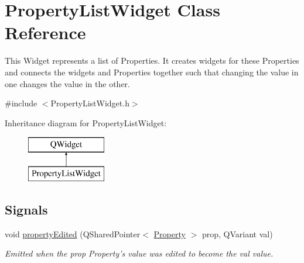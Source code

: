 \hypertarget{class_property_list_widget}{\section{Property\-List\-Widget Class Reference}
\label{class_property_list_widget}
}


This Widget represents a list of Properties. It creates widgets for these Properties and connects the widgets and Properties together such that changing the value in one changes the value in the other.  




{\ttfamily \#include $<$Property\-List\-Widget.\-h$>$}

Inheritance diagram for Property\-List\-Widget\-:\begin{figure}[H]
\begin{center}
\leavevmode
\includegraphics[height=2.000000cm]{class_property_list_widget}
\end{center}
\end{figure}
\subsection*{Signals}
\begin{DoxyCompactItemize}
\item 
\hypertarget{class_property_list_widget_a4cef6a2b7ac56007d324c7c7dd89a58f}{void \hyperlink{class_property_list_widget_a4cef6a2b7ac56007d324c7c7dd89a58f}{property\-Edited} (Q\-Shared\-Pointer$<$ \hyperlink{class_picto_1_1_property}{Property} $>$ prop, Q\-Variant val)}\label{class_property_list_widget_a4cef6a2b7ac56007d324c7c7dd89a58f}

\begin{DoxyCompactList}\small\item\em Emitted when the prop Property's value was edited to become the val value. \end{DoxyCompactList}\end{DoxyCompactItemize}
